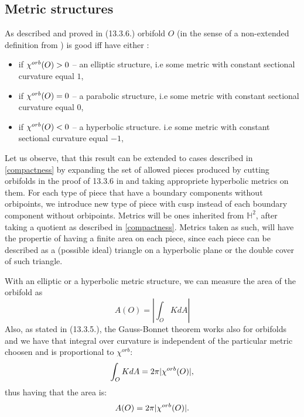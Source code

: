 \subsection{Metric structures}
As described and proved in \cite{Thurston1979} (13.3.6.) orbifold $O$ (in the sense of 
a non-extended definition from \cite{Thurston1979})
is good iff 
have
either 
:
\begin{itemize}
\item if ${\chi^{orb}(O)} > 0$ -- an elliptic structure, i.e some metric with constant sectional 
curvature equal $1$,  
\item if ${\chi^{orb}(O)} = 0$ -- a parabolic structure, i.e some metric with constant sectional 
curvature equal $0$,
\item if ${\chi^{orb}(O)} < 0$ -- a hyperbolic structure. i.e some metric with constant sectional 
curvature equal $-1$,
\end{itemize}
Let us observe, that this result can be extended to cases described in 
\ref{compactness} by expanding 
the set of allowed pieces produced by cutting orbifolds in the proof of 13.3.6 in  
\cite{Thurston1979} and taking appropriete hyperbolic metrics on them. 
For each type of piece that have a boundary components without orbipoints, we introduce 
new type of piece with cusp instead of each boundary component without orbipoints. 
Metrics will be ones inherited from $\mathbb{H}^2$, after taking a
quotient as described in \ref{compactness}. Metrics taken as such, will have 
the propertie of having a finite area on each piece, since each piece can be described as a 
(possible ideal) triangle on a hyperbolic plane or the double cover of such triangle.   

With an elliptic or a hyperbolic metric structure, we can measure the area of the orbifold as 
\begin{equation}
A(O) = |\int_O K dA|
\end{equation} 
Also, as stated in \cite{Thurston1979} (13.3.5.), the Gauss-Bonnet 
theorem works also for orbifolds 
and we have that integral over curvature is independent of the particular metric choosen 
and is proportional to $\chi^{orb}$:
\begin{equation}
\int_O K dA = 2\pi|{\chi^{orb}(O)}|,
\end{equation}
thus having that the area is:
\begin{equation}\label{area to chi}
A(O) = 2\pi|{\chi^{orb}(O)}|.
\end{equation}

